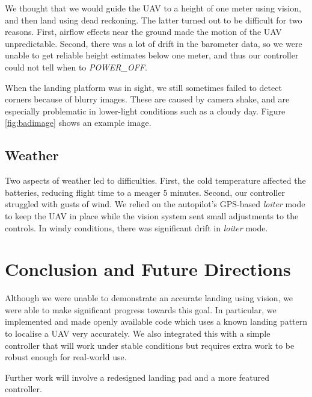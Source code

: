 \documentclass[10pt]{scrartcl} %
\begin{document}
We thought that we would guide the UAV to a height of one meter using vision,
and then land using dead reckoning. The latter turned out to be difficult for
two reasons. First, airflow effects near the ground made the motion of the UAV
unpredictable. Second, there was a lot of drift in the barometer data, so we
were unable to get reliable height estimates below one meter, and thus our
controller could not tell when to \textit{POWER\_OFF}.

When the landing platform was in sight, we still sometimes failed to detect
corners because of blurry images. These are caused by camera shake, and are
especially problematic in lower-light conditions such as a cloudy day. Figure
\ref{fig:badimage} shows an example image.

\subsection{Weather}

Two aspects of weather led to difficulties. First, the cold temperature
affected the batteries, reducing flight time to a meager 5 minutes.  Second,
our controller struggled with gusts of wind. We relied on the autopilot's
GPS-based \textit{loiter} mode to keep the UAV in place while the vision system
sent small adjustments to the controls. In windy conditions, there was
significant drift in \textit{loiter} mode.


\section{Conclusion and Future Directions}

Although we were unable to demonstrate an accurate landing using vision, we
were able to make significant progress towards this goal. In particular, we
implemented and made openly available code which uses a known landing pattern
to localise a UAV very accurately. We also integrated this with a simple
controller that will work under stable conditions but requires extra work to be
robust enough for real-world use.

Further work will involve a redesigned landing pad and a more featured controller.


\printbibliography

\end{document}
